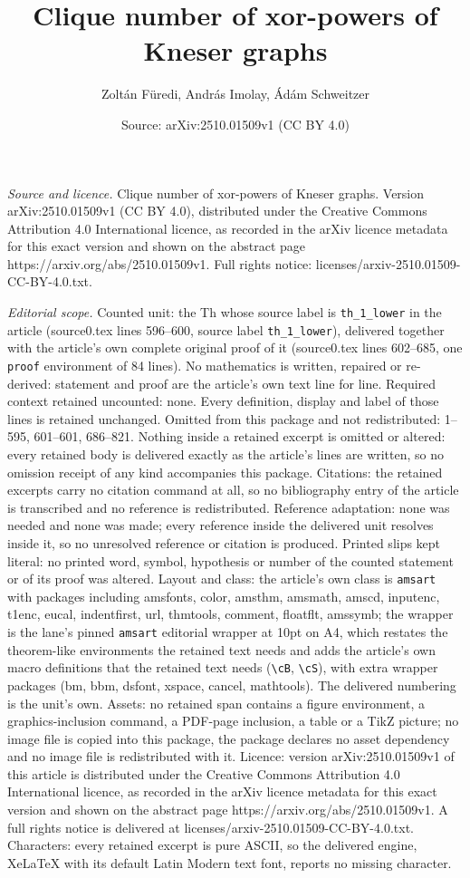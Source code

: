 \documentclass[10pt,a4paper]{amsart}
\title[Clique number of xor-powers of Kneser graphs]{Clique number of xor-powers of Kneser graphs}
\author{Zolt\'an F\"uredi, Andr\'as Imolay, \'Ad\'am Schweitzer}
\date{Source: arXiv:2510.01509v1 (CC BY 4.0)}
\begin{document}
\maketitle

\noindent\emph{Source and licence.} Clique number of xor-powers of Kneser graphs. Version arXiv:2510.01509v1 (CC BY 4.0), distributed under the Creative Commons Attribution 4.0 International licence, as recorded in the arXiv licence metadata for this exact version and shown on the abstract page https://arxiv.org/abs/2510.01509v1. Full rights notice: licenses/arxiv-2510.01509-CC-BY-4.0.txt.\par\smallskip

\noindent\textit{Editorial scope.} Counted unit: the Th whose source label is \texttt{th\_1\_lower} in the article (source0.tex lines 596--600, source label \texttt{th\_1\_lower}), delivered together with the article's own complete original proof of it (source0.tex lines 602--685, one \texttt{proof} environment of 84 lines). No mathematics is written, repaired or re-derived: statement and proof are the article's own text line for line. Required context retained uncounted: none. Every definition, display and label of those lines is retained unchanged. Omitted from this package and not redistributed: 1--595, 601--601, 686--821. Nothing inside a retained excerpt is omitted or altered: every retained body is delivered exactly as the article's lines are written, so no omission receipt of any kind accompanies this package. Citations: the retained excerpts carry no citation command at all, so no bibliography entry of the article is transcribed and no reference is redistributed. Reference adaptation: none was needed and none was made; every reference inside the delivered unit resolves inside it, so no unresolved reference or citation is produced. Printed slips kept literal: no printed word, symbol, hypothesis or number of the counted statement or of its proof was altered. Layout and class: the article's own class is \texttt{amsart} with packages including amsfonts, color, amsthm, amsmath, amscd, inputenc, t1enc, eucal, indentfirst, url, thmtools, comment, floatflt, amssymb; the wrapper is the lane's pinned \texttt{amsart} editorial wrapper at 10pt on A4, which restates the theorem-like environments the retained text needs and adds the article's own macro definitions that the retained text needs (\texttt{\textbackslash cB}, \texttt{\textbackslash cS}), with extra wrapper packages (bm, bbm, dsfont, xspace, cancel, mathtools). The delivered numbering is the unit's own. Assets: no retained span contains a figure environment, a graphics-inclusion command, a PDF-page inclusion, a table or a TikZ picture; no image file is copied into this package, the package declares no asset dependency and no image file is redistributed with it. Licence: version arXiv:2510.01509v1 of this article is distributed under the Creative Commons Attribution 4.0 International licence, as recorded in the arXiv licence metadata for this exact version and shown on the abstract page https://arxiv.org/abs/2510.01509v1. A full rights notice is delivered at licenses/arxiv-2510.01509-CC-BY-4.0.txt. Characters: every retained excerpt is pure ASCII, so the delivered engine, XeLaTeX with its default Latin Modern text font, reports no missing character.
\end{document}
